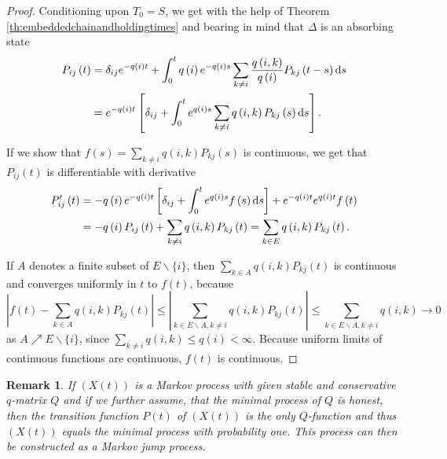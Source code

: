 \documentclass[12pt,a4paper]{scrartcl}
\newtheorem {remark}[theorem]{Remark}
\numberwithin{equation}{section}
\begin{document}
\begin{proof} Conditioning upon $T_0 = S$, we get with the help of Theorem \ref{th:embeddedchainandholdingtimes} and bearing in mind that $\Delta$ is an absorbing state
\begin{align*} P_{ij}\left(t\right) &= \delta_{ij}e^{-q\left(i\right)t} + \int_{0}^t q\left(i\right) e^{-q\left(i\right) s} \sum_{k \neq i} \frac{q\left(i,k\right)}{q\left(i\right)} P_{kj}\left(t-s\right) \textnormal{d}s \\
&= e^{-q\left(i\right) t} \left[\delta_{ij} + \int_0^t e^{q\left(i\right) s} \sum_{k \neq i} q\left(i,k\right) P_{kj}\left(s\right) \textnormal{d}s \right].
\end{align*}

If we show that $ f\left(s\right) = \sum_{k \neq i} q\left(i,k\right) P_{kj}\left(s\right) $ is continuous, we get that $P_{ij}\left(t\right)$ is differentiable with derivative
\begin{align*}
P_{ij}'\left(t\right) &= -q\left(i\right)e^{-q\left(i\right)t}\left[\delta_{ij} + \int_0^t e^{q\left(i\right)s}f\left(s\right) \textnormal{d}s \right] + e^{-q\left(i\right)t} e^{q\left(i\right)t} f\left(t\right) \\
&= -q\left(i\right) P_{ij}\left(t\right) + \sum_{k \neq i} q\left(i,k\right) P_{kj}\left(t\right) = \sum_{k \in E} q\left(i,k\right) P_{kj}\left(t\right).
\end{align*}

If $A$ denotes a finite subset of $E\backslash \lbrace i\rbrace $, then $\sum_{k \in A} q\left(i,k\right) P_{kj}\left(t\right)$ is continuous and converges uniformly in $t$ to $f\left(t\right)$, because
$$\left|f\left(t\right) - \sum_{k \in A} q\left(i,k\right) P_{kj}\left(t\right) \right| \leq \left| \sum_{k \in E\backslash A, k \neq i} q\left(i,k\right) P_{kj}\left(t\right) \right| \leq \sum_{k \in E\backslash A, k \neq i} q\left(i,k\right) \to 0 $$
as $ A \nearrow E\backslash \lbrace i\rbrace $, since $\sum_{k \neq i} q\left(i,k\right) \leq q\left(i\right) < \infty $. Because uniform limits of continuous functions are continuous, $f\left(t\right)$ is continuous.


\end{proof}

\begin{remark}
\label{RemarktoSetting}
If $\left(X\left(t\right)\right)$ is a Markov process with given stable and conservative $q$-matrix $Q$ and if we further assume, that the minimal process of $Q$ is honest, then the transition function $P\left(t\right)$ of $\left(X\left(t\right)\right)$ is the only $Q$-function and thus $\left(X\left(t\right)\right)$ equals the minimal process with probability one. This process can then be constructed as a Markov jump process.
\end{remark}
\end{document}
